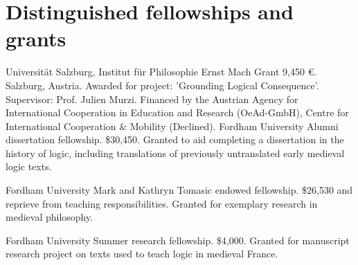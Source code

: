 \section{Distinguished fellowships and grants}
{%
	Universit\"at Salzburg, Institut f\"ur Philosophie}
{%
	Ernst Mach Grant}
{9,450 €. Salzburg, Austria. Awarded for project: 'Grounding Logical Consequence'. Supervisor: Prof. Julien Murzi. Financed by the Austrian Agency for International Cooperation in Education and Research (OeAd-GmbH), Centre for International Cooperation \& Mobility (Declined).}
{%
	Fordham  University}
{%
	Alumni dissertation fellowship.}
{\$30,450. Granted to aid completing a dissertation in the history of logic, including translations of previously untranslated early medieval logic texts.}

{Fordham University}
{
	Mark and Kathryn Tomasic endowed fellowship.}
{\$26,530 and reprieve from teaching responsibilities. Granted for exemplary research in medieval philosophy.}

{Fordham University}
{
	Summer research fellowship.}
{\$4,000. Granted for manuscript research project on texts used to teach logic in medieval France.}